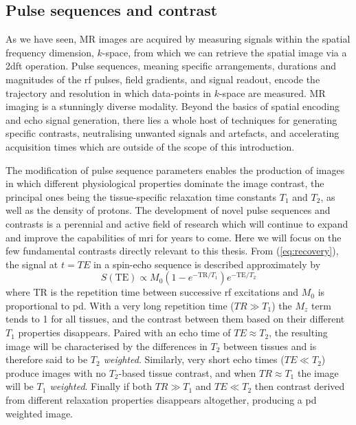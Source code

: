 \subsection{Pulse sequences and contrast}

As we have seen, MR images are acquired by measuring signals within the spatial frequency dimension, $k$-space, from which we can retrieve the spatial image via a \gls{2dft} operation.
Pulse sequences, meaning specific arrangements, durations and magnitudes of the \gls{rf} pulses, field gradients, and signal readout, encode the trajectory and resolution in which data-points in $k$-space are measured.
MR imaging is a stunningly diverse modality.
Beyond the basics of spatial encoding and echo signal generation, there lies a whole host of techniques for generating specific contrasts, neutralising unwanted signals and artefacts, and accelerating acquisition times which are outside of the scope of this introduction.

The modification of pulse sequence parameters enables the production of images in which different physiological properties dominate the image contrast, the principal ones being the tissue-specific relaxation time constants $T_1$ and $T_2$, as well as the density of protons.
The development of novel pulse sequences and contrasts is a perennial and active field of research which will continue to expand and improve the capabilities of \gls{mri} for years to come.
Here we will focus on the few fundamental contrasts directly relevant to this thesis.
From (\ref{eq:recovery}), the signal at $t=TE$ in a spin-echo sequence is described approximately by
\begin{equation}
  S(\text{TE}) \propto M_0 (1-e^{-\text{TR}/T_1})e^{-\text{TE}/T_2}
\end{equation}
where TR is the repetition time between successive \gls{rf} excitations and $M_0$ is proportional to \gls{pd}.
With a very long repetition time ($TR\gg T_1$) the $M_z$ term tends to 1 for all tissues, and the contrast between them based on their different $T_1$ properties disappears.
Paired with an echo time of $TE\approx T_2$, the resulting image will be characterised by the differences in $T_2$ between tissues and is therefore said to be \textit{$T_2$ weighted}.
Similarly, very short echo times ($TE\ll T_2$) produce images with no $T_2$-based tissue contrast, and when $TR\approx T_1$ the image will be \textit{$T_1$ weighted}.
Finally if both $TR\gg T_1$ and $TE\ll T_2$ then contrast derived from different relaxation properties disappears altogether, producing a \gls{pd} weighted image.

